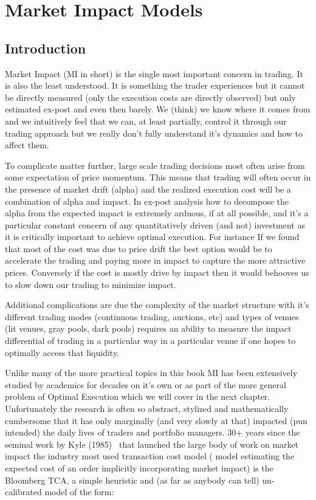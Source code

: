 
\chapter{Market Impact Models}

\section{Introduction}
Market Impact (MI in short) is the single most important concern in trading. It is also the least understood.  
It is something the trader experiences but it cannot be directly measured (only the execution costs are directly observed) but only estimated ex-post and even then barely. We (think) we know where it comes from  and we intuitively feel that we can, at least partially, control it through our trading approach but we really don't fully understand it's dynamics and how to affect them.

To complicate matter further, large scale trading decisions most often arise from some expectation of price momentum. This means that trading will often occur in the presence of market drift (alpha) and the realized execution cost will be a combination of alpha and impact. In ex-post analysis how to decompose  the alpha from the expected impact is extremely arduous, if at all possible, and it's a particular constant concern of any quantitatively driven (and not) investment as it is critically important to achieve optimal execution. For instance If we found that most of the cost was due to price drift the best option would be to accelerate the trading and paying more in impact to capture the more attractive prices. Conversely if the cost is mostly drive by impact then it would behooves us to slow down our trading to minimize impact.

Additional complications are due the complexity of the market structure with it's different trading modes (continuous trading, auctions, etc) and types of venues (lit venues, gray pools, dark pools) requires an ability to measure the impact differential of trading in a particular way in a particular venue if one hopes to optimally access that liquidity.

Unlike many of the more practical topics in this book MI has been extensively studied by academics for decades on it's own or as part of the more general problem of Optimal Execution which we will cover in the next chapter. Unfortunately the research is often so abstract, stylized and mathematically cumbersome that it has only marginally (and very slowly at that) impacted (pun intended) the daily lives of traders and portfolio managers. 30+ years since the seminal work by Kyle (1985)~\cite{kyle1985} that launched the large body of work on market impact the industry most used transaction cost model ( model estimating the expected cost of an order implicitly incorporating market impact) is   the Bloomberg TCA, a simple heuristic and (as far as anybody can tell) un-calibrated model of the form:

